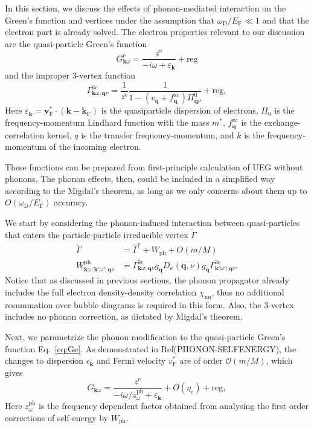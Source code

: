 \documentclass[%
 reprint,
superscriptaddress,
 amsmath,amssymb,
 aps,
prx,
]{revtex4-2}
\newcommand{\bq}{\mathbf{q}}
\newcommand{\bk}{\mathbf{k}}
\newcommand{\Gammapp}{\tilde{\Gamma}}
\newcommand{\txe}{\text{e}}
\newcommand{\txD}{\text{D}}
\newcommand{\txF}{\text{F}}
\newcommand{\txnn}{\text{nn}}
\newcommand{\txph}{\text{ph}}
\newcommand{\txxc}{\text{xc}}
\begin{document}
\begin{appendices}
In this section, we discuss the effects of phonon-mediated interaction on the Green's function and vertices under the assumption that $\omega_\txD/E_\txF\ll 1$ and that the electron part is already solved. 
The electron properties relevant to our discussion are the quasi-particle Green's function
\begin{equation}
\label{eq:Ge}
  G^{\txe}_{\bk\omega} = \frac{z^\txe}{-i\omega + \varepsilon_{\bk}} + \text{reg}%
\end{equation}
and the improper 3-vertex function
\begin{equation}
    \Gamma^{3\txe}_{\bk\omega;\bq \nu} = \frac{1}{z^\txe}\frac{1}{1-(v_{\bq} + f_{\bq}^{\txxc})\Pi^0_{\bq \nu}} + \text{reg},
    \label{eq:ver3_ansatz}
\end{equation}
Here $\varepsilon_{\bk}=\mathbf{v}_\txF^*\cdot (\bk-\bk_\txF)$ is the quasiparticle dispersion of electrons,  $\Pi_0$ is the frequency-momentum Lindhard function with the mass $m^*$, $f_\bq^{\txxc}$ is the exchange-correlation kernel,
$q$ is the transfer frequency-momentum, and $k$ is the frequency-momentum of the incoming electron.

These functions can be prepared from first-principle calculation of UEG without phonons. The phonon effects, then, could be included in a simplified way according to the Migdal's theorem, as long as we only concerns about them up to $O(\omega_\txD/E_\txF)$ accuracy.


We start by considering the phonon-induced interaction between quasi-particles that enters the particle-particle irreducible vertex $\Gammapp$
\begin{align}
\label{eq:gammapp_ph}
 \Gammapp&=\Gammapp^\txe+W_{\txph}+O(m/M)\\
W^{\txph}_{\bk\omega; \bk'\omega'; \bq\nu} &= \Gamma^{3\txe}_{\bk\omega;\bq\nu} {g_{\bq}{D}_{\kappa}(\bq,\nu) g_{\bq}}\Gamma^{3\txe}_{\bk'\omega';\bq\nu}.
\label{eq:Wph}
\end{align}
Notice that as discussed in previous sections, the phonon propagator already includes the full electron density-density correlation $\chi_{\txnn}$, thus no additional resummation over bubble diagrams is required in this form.
Also, the 3-vertex includes no phonon correction, as dictated by Migdal's theorem.

Next, we parametrize the phonon modification to the quasi-particle Green's function Eq.~\eqref{eq:Ge}. As demonstrated in Ref(PHONON-SELFENERGY), the changes to dispersion $\epsilon_{\bk}$ and Fermi velocity $v_{\txF}^*$  are of order $\mathcal{O}(m/M)$, which gives
\begin{equation}
  G_{\bk\omega} = \frac{z^\txe}{-i\omega/z^{\txph}_{\omega} + \varepsilon_{\bk}} +O(\eta_\txe)+\text{reg},
\end{equation}
Here $z^{\txph}_{\omega}$ is the frequency dependent factor obtained from analysing the first order corrections of self-energy by $W_{\txph}$. 





\end{appendices}
\end{document}
